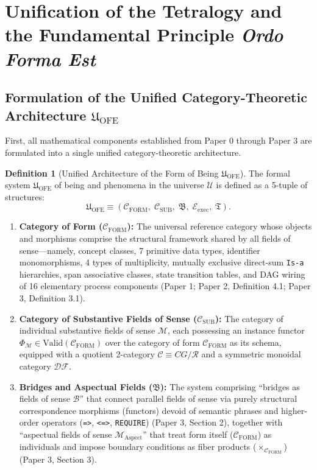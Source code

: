 \documentclass[11pt,a4paper]{article}
\theoremstyle{definition}
\newtheorem{definition}{Definition}[section]
\theoremstyle{plain}
\begin{document}
\section{Unification of the Tetralogy and the Fundamental Principle \textit{Ordo Forma Est}}

\subsection{Formulation of the Unified Category-Theoretic Architecture $\mathfrak{U}_{\mathrm{OFE}}$}
First, all mathematical components established from Paper 0 through Paper 3 are formulated into a single unified category-theoretic architecture.

\begin{definition}[Unified Architecture of the Form of Being $\mathfrak{U}_{\mathrm{OFE}}$]
The formal system $\mathfrak{U}_{\mathrm{OFE}}$ of being and phenomena in the universe $\mathcal{U}$ is defined as a 5-tuple of structures:
\[
\mathfrak{U}_{\mathrm{OFE}} \equiv \left(\mathcal{C}_{\mathrm{FORM}},\; \mathcal{C}_{\mathrm{SUB}},\; \mathfrak{B},\; \mathcal{E}_{\mathrm{exec}},\; \mathfrak{T}\right).
\]
\begin{enumerate}
    \item \textbf{Category of Form ($\mathcal{C}_{\mathrm{FORM}}$):} The universal reference category whose objects and morphisms comprise the structural framework shared by all fields of sense---namely, concept classes, 7 primitive data types, identifier monomorphisms, 4 types of multiplicity, mutually exclusive direct-sum \texttt{Is-a} hierarchies, span associative classes, state transition tables, and DAG wiring of 16 elementary process components (Paper 1; Paper 2, Definition 4.1; Paper 3, Definition 3.1).
    \item \textbf{Category of Substantive Fields of Sense ($\mathcal{C}_{\mathrm{SUB}}$):} The category of individual substantive fields of sense $\mathcal{M}$, each possessing an instance functor $\Phi_{\mathcal{M}} \in \mathrm{Valid}(\mathcal{C}_{\mathrm{FORM}})$ over the category of form $\mathcal{C}_{\mathrm{FORM}}$ as its schema, equipped with a quotient 2-category $\mathcal{C} \equiv CG/\mathcal{R}$ and a symmetric monoidal category $\mathcal{DF}$.
    \item \textbf{Bridges and Aspectual Fields ($\mathfrak{B}$):} The system comprising ``bridges as fields of sense $\mathcal{B}$'' that connect parallel fields of sense via purely structural correspondence morphisms (functors) devoid of semantic phrases and higher-order operators (\texttt{=>}, \texttt{<=>}, \texttt{REQUIRE}) (Paper 3, Section 2), together with ``aspectual fields of sense $\mathcal{M}_{\mathrm{Aspect}}$'' that treat form itself ($\mathcal{C}_{\mathrm{FORM}}$) as individuals and impose boundary conditions as fiber products ($\times_{\mathcal{C}_{\mathrm{FORM}}}$) (Paper 3, Section 3).

\end{enumerate}
\end{definition}
\end{document}
